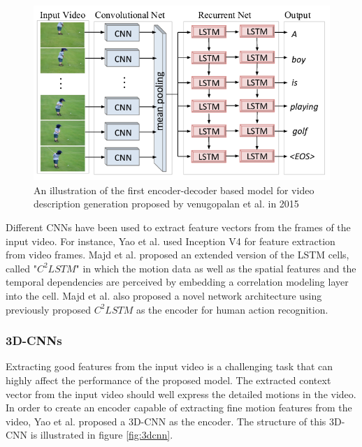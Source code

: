 \documentclass[preprint, 12pt]{elsarticle}
\begin{document}
		\begin{figure}[h]
			\centering
			\includegraphics[scale=0.5]{Imgs/vid1.png}
			\caption{An illustration of the first encoder-decoder based model for video description generation proposed by venugopalan et al. in 2015 \cite{venugopalan2014translating}}
			\label{fig:vid1}
		\end{figure}
	
		Different CNNs have been used to extract feature vectors from the frames of the input video. For instance, Yao et al. \cite{yao2017boosting} used Inception V4 \cite{szegedy2017inception} for feature extraction from video frames. Majd et al. \cite{majd2018correlation} proposed an extended version of the LSTM cells, called "\textit{$C^2LSTM$}" in which the motion data  as well as the spatial features and the temporal dependencies are perceived by embedding a correlation modeling layer into the cell. Majd et al. \cite{majd2019motion} also proposed a novel network architecture using previously proposed $C^2LSTM$ as the encoder for human action recognition.
	
		\subsubsection{3D-CNNs}
		Extracting good features from the input video is a challenging task that can highly affect the performance of the proposed model. The extracted context vector from the input video should well express the detailed motions in the video. In order to create an encoder capable of extracting fine motion features from the video, Yao et al. \cite{yao2015describing} proposed a 3D-CNN as the encoder. The structure of this 3D-CNN is illustrated in figure \ref{fig:3dcnn}.
		
\end{document}
